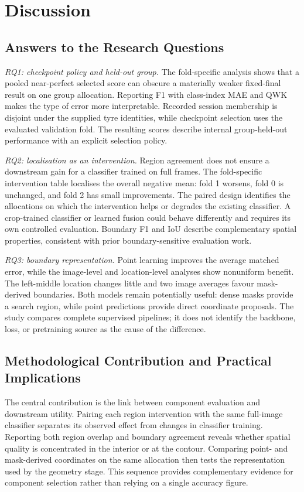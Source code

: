 \section{Discussion}
\label{sec:discussion}
\subsection{Answers to the Research Questions}
\textit{RQ1: checkpoint policy and held-out group.} The fold-specific analysis shows that a pooled near-perfect selected score can obscure a materially weaker fixed-final result on one group allocation. Reporting F1 with class-index MAE and QWK makes the type of error more interpretable. Recorded session membership is disjoint under the supplied tyre identities, while checkpoint selection uses the evaluated validation fold. The resulting scores describe internal group-held-out performance with an explicit selection policy.

\textit{RQ2: localisation as an intervention.} Region agreement does not ensure a downstream gain for a classifier trained on full frames. The fold-specific intervention table localises the overall negative mean: fold 1 worsens, fold 0 is unchanged, and fold 2 has small improvements. The paired design identifies the allocations on which the intervention helps or degrades the existing classifier. A crop-trained classifier or learned fusion could behave differently and requires its own controlled evaluation. Boundary F1 and IoU describe complementary spatial properties, consistent with prior boundary-sensitive evaluation work.

\textit{RQ3: boundary representation.} Point learning improves the average matched error, while the image-level and location-level analyses show nonuniform benefit. The left-middle location changes little and two image averages favour mask-derived boundaries. Both models remain potentially useful: dense masks provide a search region, while point predictions provide direct coordinate proposals. The study compares complete supervised pipelines; it does not identify the backbone, loss, or pretraining source as the cause of the difference.

\subsection{Methodological Contribution and Practical Implications}
The central contribution is the link between component evaluation and downstream utility. Pairing each region intervention with the same full-image classifier separates its observed effect from changes in classifier training. Reporting both region overlap and boundary agreement reveals whether spatial quality is concentrated in the interior or at the contour. Comparing point- and mask-derived coordinates on the same allocation then tests the representation used by the geometry stage. This sequence provides complementary evidence for component selection rather than relying on a single accuracy figure.

